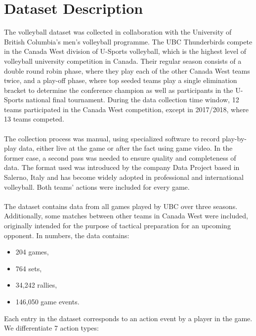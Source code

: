 \documentclass{sfuthesis}
\begin{document}
	\section{Dataset Description}
	The volleyball dataset was collected in collaboration with the University of British Columbia's men's volleyball programme. The UBC Thunderbirds compete in the Canada West division of U-Sports volleyball, which is the highest level of volleyball university competition in Canada. Their regular season consists of a double round robin phase, where they play each of the other Canada West teams twice, and a play-off phase, where top seeded teams play a single elimination bracket to determine the conference champion as well as participants in the U-Sports national final tournament. During the data collection time window, 12 teams participated in the Canada West competition, except in 2017/2018, where 13 teams competed.\\\\
	The collection process was manual, using specialized software to record play-by-play data, either live at the game or after the fact using game video. In the former case, a second pass was needed to ensure quality and completeness of data. The format used was introduced by the company Data Project based in Salerno, Italy and has become widely adopted in professional and international volleyball. Both teams' actions were included for every game.\\\\
	The dataset contains data from all games played by UBC over three seasons. Additionally, some matches between other teams in Canada West were included, originally intended for the purpose of tactical preparation for an upcoming opponent. In numbers, the data contains:
	\begin{itemize}
		\item 204 games,
		\item 764 sets,
		\item 34,242 rallies,
		\item 146,050 game events.
	\end{itemize}
	Each entry in the dataset corresponds to an action event by a player in the game. We differentiate 7 action types:
\end{document}
